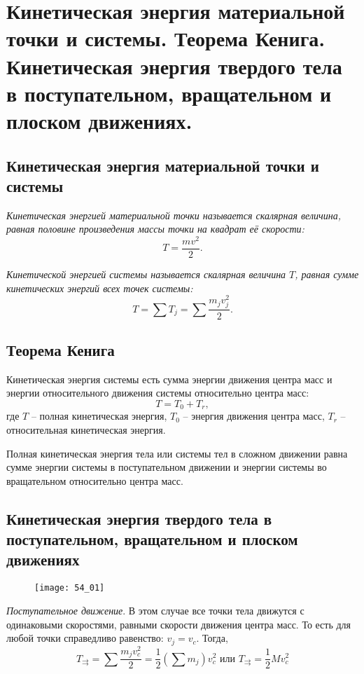 \chapter{Кинетическая энергия материальной точки и системы. Теорема Кенига.
Кинетическая энергия твердого тела в поступательном, вращательном и плоском
движениях.}

\section{Кинетическая энергия материальной точки и системы}

\emph{Кинетическая энергией материальной точки называется 
скалярная величина, равная половине произведения 
массы точки на квадрат её скорости:}
\[
	T = \frac{mv^2}{2}.
\]

\emph{Кинетической энергией системы называется скалярная величина 
\( T \), равная сумме кинетических энергий всех точек системы:}
\[
	T = \sum T_j = \sum\frac{m_j v^2_j}{2}.
\]

\section{Теорема Кенига}
Кинетическая энергия системы есть сумма энергии движения центра масс и энергии 
относительного движения системы относительно центра масс:
\[
	T = T_0 + T_r,
\]
где \( T \) -- полная кинетическая энергия, \( T_0 \) -- энергия движения 
центра масс, \( T_r \) -- относительная кинетическая энергия.

Полная кинетическая энергия тела или системы тел в сложном движении равна 
сумме энергии системы в поступательном движении и энергии системы во 
вращательном относительно центра масс.

\section{Кинетическая энергия твердого тела в поступательном, вращательном 
и плоском движениях}

\begin{figure}[h!]
	\center
    \texttt{[image: 54\_01]}
    \caption{}
    \label{pic54_01}
\end{figure}

\emph{Поступательное движение}. В этом случае все точки тела движутся 
с одинаковыми скоростями, равными скорости движения центра масс. То есть 
для любой точки справедливо равенство: \( v_j = v_c \). Тогда, 
\[ 
	T_{\rightrightarrows} = \sum\frac{m_j v^2_c}{2} = 
	\frac{1}{2}\left( \sum m_j \right)v^2_c
	\text{ или }
	T_{\rightrightarrows} = \frac{1}{2}Mv^2_c
\]

